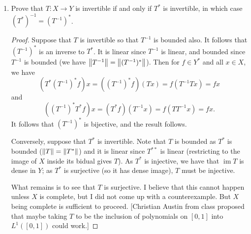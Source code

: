 \documentclass[11pt]{article}
\DeclareMathOperator{\im}{im}
\DeclareMathOperator{\dist}{dist}
\begin{document}
\begin{enumerate}
\begin{enumerate}
\begin{proof}
          Now suppose that $X$ is reflexive so that $\hat{~}\colon X\to X^{\ast\ast}$ is surjective. By identifying $X$ with $X^{\ast\ast}$ we have $T = T^{\ast\ast}|_X = T^{\ast\ast}$. Suppose that $\overline{\im T^\ast}\neq X^\ast$ so that there is $f\in X^\ast$ with nonzero distance $\dist(f,\overline{\im T^\ast}) = \varepsilon>0$ to $\overline{\im T^\ast}$. Choose via Hahn-Banach a $g\in X^{\ast\ast}$ such that $\norm{g} = 1$, $g|_{\overline{\im T^\ast}} = 0$, and $gf = \varepsilon$. With $\hat{~}$ surjective we have that $g =\widehat{x_g}$ for some nonzero (as $g$ is nonzero) $x_g\in X$. We show that $T^{\ast\ast}g = T^{\ast\ast}\widehat{x_g}$ is the zero map. For $h\in Y^\ast$, we have $(T^{\ast\ast}\widehat{x_g})h = g(T^\ast h) = 0$ since $g$ is zero on $\overline{\im T^\ast}$. Since $T^{\ast\ast}\widehat{x_g}$ is the zero map it follows that $\widehat{Tx_g}$ is the zero map; equivalently, $Tx_g = 0$ (evaluation at $Tx_g$ is zero if and only if $Tx_g$ was the zero vector since there are linear functionals which detect norms.).
        \end{proof}
        \item Prove that $T : X \to Y$ is invertible if and only if $T^\ast$ is invertible, in which case
        $(T^\ast)^{-1} = (T^{-1})^{\ast}$. \begin{proof}
          Suppose that $T$ is invertible so that $T^{-1}$ is bounded also. It follows that $(T^{-1})^\ast$ is an inverse to $T^\ast$. It is linear since $T^{-1}$ is linear, and bounded since $T^{-1}$ is bounded (we have $\norm{T^{-1}} = \norm{(T^{-1})^\ast}$). Then for $f\in Y^\ast$ and all $x\in X$, we have \[(T^\ast(T^{-1})^\ast f)x = ((T^{-1})^\ast f)(Tx) = f(T^{-1}Tx) = fx\] and \[((T^{-1})^\ast T^\ast f)x = (T^\ast f)(T^{-1}x) = f(TT^{-1}x) = fx.\] It follows that $(T^{-1})^\ast$ is bijective, and the result follows. 

          Conversely, suppose that $T^\ast$ is invertible. Note that $T$ is bounded as $T^\ast$ is bounded ($\norm{T} = \norm{T^\ast}$) and it is linear since $T^{\ast\ast}$ is linear (restricting to the image of $X$ inside its bidual gives $T$).
          As $T^\ast$ is injective, we have that $\im T$ is dense in $Y$; as $T^\ast$ is surjective (so it has dense image), $T$ must be injective.

          What remains is to see that $T$ is surjective. I believe that this cannot happen unless $X$ is complete, but I did not come up with a counterexample. But $X$ being complete is sufficient to proceed. [Christian Austin from class proposed that maybe taking $T$ to be the inclusion of polynomials on $[0,1]$ into $L^1([0,1])$ could work.]


\end{proof}
\end{enumerate}
\end{enumerate}
\end{document}
